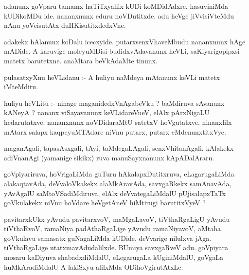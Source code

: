 \documentclass{article}
\begin{document}
\begin{mn}
adanunx  goVparu  tamamx  haTiTxyalilx  kUDi koMDidAdxre.  hasuviniMda  kUDikoMDu  ide.  
nananxnunx  eduru  noVDutitxde.  adu  heVge  jiVvisiVteMdu  nAnu  yoVcisutAtx  duHKisutitxdedxVne.
\end{mn}

\begin{mn}
adakekx  hAlanunx  koDalu  icecxyide.  putarxsenxVhaveMbudu  nananxnunx  hAge  mADide.  A  karuvige  
moleyuMDisi  budidxvAdavanunx  heVLi,  saKiyarigopipxsi  matetx  barutetxne.  anaMtara  beVkAdaMte  tinunx.
\end{mn}

\begin{mn}
pulasatxyXnu  heVLidanu :- A  huliyu  naMdeya  mAtanunx  keVLi  matetx   iMteMditu.
\end{mn}

\begin{mn}
huliyu  heVLitu :- ninage  maganidedxVnAgabeVku ?  baMdiruva  sAvanunx  kANeyA ?  nananx  
viSayavanunx  keVLidareVneV,  elAlx  pArxNigaLU  hedarutatxve. nananxnunx  noVDidaraMtU 
satetxV  hoVgutatxve.  ninanxlilx  mAtarx  salapx  kaqpeyuMTAdare  niVnu  putarx,  putarx  eMdenunxtitxVye.
\end{mn}

\begin{mn}
maganAgali,  tapasAsxgali,  tAyi,  taMdegaLAgali,  senxVhitanAgali.  kAlakekx  adiVnanAgi 
(yamanige  sikikx)  ruva  manuSayxnanunx  kApADalAraru.
\end{mn}

\begin{mn}
goVpiyariruva,  hoVrigaLiMda  guTuru  hAkalapxDutitxruva,  eLagarugaLiMda  alakaqtavAda,  
deVvaloVkakekx  alaMkAravAda,  savxgaRkekx  samAnavAda,  yAvAgalU  saMtoVSadiMdiruva,  elAlx  
deVvategaLiMdalU  pUjisalapxTaTx  goVkulakekx  niVnu  hoVdare  heVgetAneV  hiMtirugi  barutitxVyeV ?
\end{mn}

\begin{mn}
pavitarxkUkx  yAvudu  pavitarxvoV,  maMgaLavoV,  tiVthaRgaLigU  yAvudu  tiVthaRvoV,  
ramaNiya  padAthaRgaLige  yAvudu  ramaNiyavoV,  aMtaha  goVkulavu  samasatx  guNagaLiMda  
kUDide.  deVvarige  nilulxva  jAga.  tiVthaRgaLige  utatxmavAdudalilxde.  BUmiya  
savxgaRveV  adu.  goVpiyara  mosaru  kaDiyuva  shabadxdiMdalU,  eLegarugaLa  kUginiMdalU,  
goVgaLa  huMkAradiMdalU  A  lakiSxyu  alilxMda  ODihoVgirutAtxLe.
\end{mn}
\end{document}

